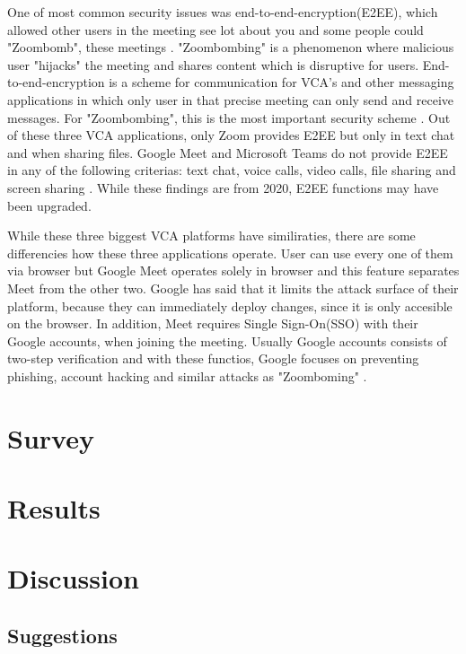 \documentclass[utf8,english]{gradu3}
\begin{document}
One of most common security issues was end-to-end-encryption(E2EE), which allowed other users in the meeting see lot about you and some people could "Zoombomb", these meetings \parencite{goneWrongZoom}. "Zoombombing" is a phenomenon where malicious user "hijacks" the meeting and shares content which is disruptive for users. End-to-end-encryption is a scheme for communication for VCA's and other messaging applications in which only user in that precise meeting can only send and receive messages. For "Zoombombing", this is the most important security scheme \parencite{e2eeZoom}.
Out of these three VCA applications, only Zoom provides E2EE but only in text chat and when sharing files. Google Meet and Microsoft Teams do not provide E2EE in any of the following criterias: text chat, voice calls, video calls, file sharing and screen sharing \parencite{safetyOfVca}. While these findings are from 2020, E2EE functions may have been upgraded.

While these three biggest VCA platforms have similiraties, there are some differencies how these three applications operate. User can use every one of them via browser but Google Meet operates solely in browser and this feature separates Meet from the other two. Google has said that it limits the attack surface of their platform, because they can immediately deploy changes, since it is only accesible on the browser. In addition, Meet requires Single Sign-On(SSO) with their Google accounts, when joining the meeting. Usually Google accounts consists of two-step verification and with these functios, Google focuses on preventing phishing, account hacking and similar attacks as "Zoomboming" \parencite{dynamicSecurityAnalysis}.

\chapter{Survey}
\label{vca}


\chapter{Results}
\label{results}



\chapter{Discussion}
\label{discussion}

\section{Suggestions}
\end{document}
